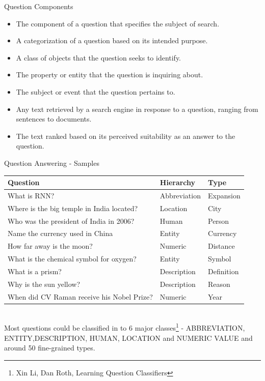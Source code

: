 \begin{frame}{Question Components}

\begin{itemize}

\item {} The component of a question that specifies the subject of search.
\item {} A categorization of a question based on its intended purpose.
\item {} A class of objects that the question seeks to identify.
\item {} The property or entity that the question is inquiring about.
\item {} The subject or event that the question pertains to.
\item {} Any text retrieved by a search engine in response to a question, ranging from sentences to documents.
\item {} The text ranked based on its perceived suitability as an answer to the question.
\end{itemize}
\end{frame}
\begin{frame}{Question Answering - Samples}
	\begin{tabular}{p{8cm}|p{3cm}|p{3cm}}
		Question&Hierarchy&Type\\
		\hline
		What is RNN?&Abbreviation&Expansion\\
		Where is the big temple in India located?&Location&City\\
		Who was the president of India in 2006?&Human&Person\\
		Name the currency used in China&Entity&Currency\\
		How far away is the moon?&Numeric&Distance\\
		What is the chemical symbol for oxygen?&Entity&Symbol\\
		What is a prism?&Description&Definition\\
		Why is the sun yellow?&Description&Reason\\
		When did CV Raman receive his Nobel Prize?&Numeric&Year\\
		\hline
	\end{tabular}\\
Most questions could be classified in to 6 major classes\footnote{Xin Li, Dan Roth, Learning Question Classifiers} - ABBREVIATION, ENTITY,DESCRIPTION, HUMAN,  LOCATION and  NUMERIC VALUE and around 50 fine-grained types.
\end{frame}

